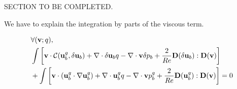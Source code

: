 \documentclass[twocolumn,10pt]{asme2ej}
\begin{document}
SECTION TO BE COMPLETED.

We have to explain the integration by parts of the viscous term.




\begin{eqnarray}
\label{NewtonWeak}
&\forall ({\bf v};q), \\
\displaystyle &\int \left[ {\bf v} \cdot {\cal C}( {\bf u}_b^g , \delta {\bf u}_b) +  \nabla  \cdot \delta {\bf u}_b q -\nabla  \cdot {\bf v} \delta p_b
+ \frac{2}{Re} {\bf D}(\delta {\bf u}_b) : {\bf D}({\bf v}) \right]
\nonumber
\\
\nonumber
\displaystyle & + \int \left[ {\bf v} \cdot ( {\bf u}_b^g \cdot \nabla {\bf u}_b^g) 
+ \nabla \cdot {\bf u}_b^g  q 
- \nabla \cdot {\bf v} p_b^g
+ \frac{2}{Re} {\bf D}({\bf u}_b^g) : {\bf D}({\bf v}) \right] = 0 
\end{eqnarray}
\end{document}
